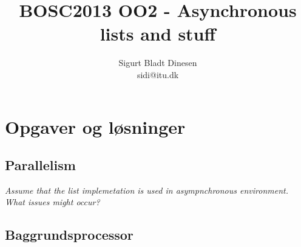 \documentclass[a4paper, titlepage]{article}
\begin{document}
\title{BOSC2013 OO2 - Asynchronous lists and stuff}
\author{Sigurt Bladt Dinesen \\sidi{@}itu.dk}
\maketitle
\section*{Opgaver og løsninger}
\subsection*{Parallelism}
\textit{Assume that the list implemetation is used in asympnchronous
environment. What issues might occur?}\\

\subsection*{Baggrundsprocessor}
\end{document}
